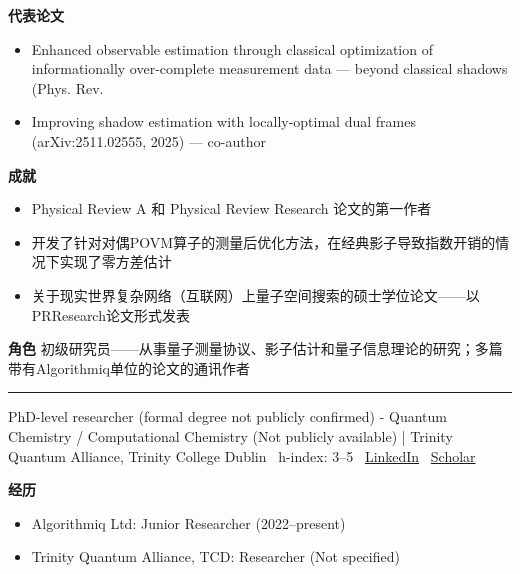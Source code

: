 \par{\footnotesize\color{mainred}\textbf{代表论文}}
\begin{itemize}[leftmargin=1.2em,itemsep=0pt,topsep=0pt]
\item {\footnotesize Enhanced observable estimation through classical optimization of informationally over-complete measurement data — beyond classical shadows (Phys. Rev.}
\item {\footnotesize Improving shadow estimation with locally-optimal dual frames (arXiv:2511.02555, 2025) — co-author}
\end{itemize}
\par{\footnotesize\color{mainred}\textbf{成就}}
\begin{itemize}[leftmargin=1.2em,itemsep=0pt,topsep=0pt]
\item {\footnotesize Physical Review A 和 Physical Review Research 论文的第一作者}
\item {\footnotesize 开发了针对对偶POVM算子的测量后优化方法，在经典影子导致指数开销的情况下实现了零方差估计}
\item {\footnotesize 关于现实世界复杂网络（互联网）上量子空间搜索的硕士学位论文——以PRResearch论文形式发表}
\end{itemize}
\par{\footnotesize\color{mainred}\textbf{角色}} {\footnotesize 初级研究员——从事量子测量协议、影子估计和量子信息理论的研究；多篇带有Algorithmiq单位的论文的通讯作者}
\vspace{2pt}\hrule\vspace{2pt}
\vspace{4pt}
\par{\footnotesize\color{graytext}PhD-level researcher (formal degree not publicly confirmed) - Quantum Chemistry / Computational Chemistry (Not publicly available) | Trinity Quantum Alliance, Trinity College Dublin \textbar\  h-index: 3–5 \textbar\  \href{https://www.linkedin.com/in/aaron-fitzpatrick-8004931bb/}{LinkedIn} \textbar\  \href{Profile exists at Semantic Scholar (ID: 2065154026) but URL could not be fetched}{Scholar}}
\par{\footnotesize\color{mainred}\textbf{经历}}
\begin{itemize}[leftmargin=1.2em,itemsep=0pt,topsep=0pt]
\item {\footnotesize Algorithmiq Ltd: Junior Researcher (2022–present)}
\item {\footnotesize Trinity Quantum Alliance, TCD: Researcher (Not specified)}
\end{itemize}
